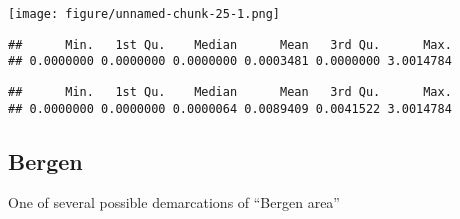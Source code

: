 \documentclass[]{article}
\newenvironment{Shaded}{\begin{snugshade}}{\end{snugshade}}
\newcommand{\KeywordTok}[1]{\textcolor[rgb]{0.13,0.29,0.53}{\textbf{#1}}}
\newcommand{\DecValTok}[1]{\textcolor[rgb]{0.00,0.00,0.81}{#1}}
\newcommand{\StringTok}[1]{\textcolor[rgb]{0.31,0.60,0.02}{#1}}
\newcommand{\OperatorTok}[1]{\textcolor[rgb]{0.81,0.36,0.00}{\textbf{#1}}}
\newcommand{\NormalTok}[1]{#1}
\begin{document}
\texttt{[image: figure/unnamed-chunk-25-1.png]}

\begin{Shaded}
\end{Shaded}

\begin{verbatim}
##      Min.   1st Qu.    Median      Mean   3rd Qu.      Max. 
## 0.0000000 0.0000000 0.0000000 0.0003481 0.0000000 3.0014784
\end{verbatim}

\begin{Shaded}
\end{Shaded}

\begin{verbatim}
##      Min.   1st Qu.    Median      Mean   3rd Qu.      Max. 
## 0.0000000 0.0000000 0.0000064 0.0089409 0.0041522 3.0014784
\end{verbatim}

\subsection{Bergen}\label{bergen}

One of several possible demarcations of ``Bergen area''
\end{document}
